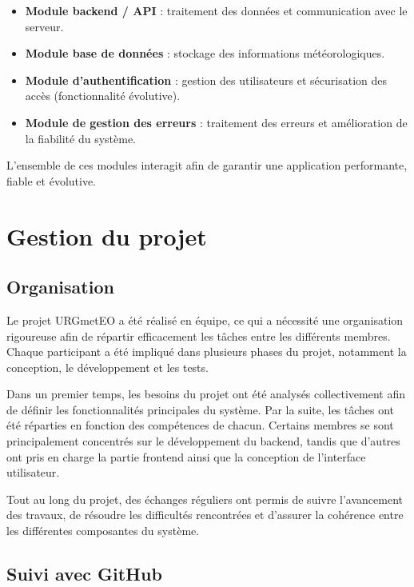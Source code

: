 \begin{itemize}

\item \textbf{Module backend / API} : traitement des données et communication avec le serveur.

\item \textbf{Module base de données} : stockage des informations météorologiques.

\item \textbf{Module d’authentification} : gestion des utilisateurs et sécurisation des accès (fonctionnalité évolutive).

\item \textbf{Module de gestion des erreurs} : traitement des erreurs et amélioration de la fiabilité du système.

\end{itemize}

\noindent L’ensemble de ces modules interagit afin de garantir une application performante, fiable et évolutive.


\section{Gestion du projet}

\subsection{Organisation}

Le projet URGmetEO a été réalisé en équipe, ce qui a nécessité une organisation rigoureuse afin de répartir efficacement les tâches entre les différents membres. Chaque participant a été impliqué dans plusieurs phases du projet, notamment la conception, le développement et les tests.

\noindent Dans un premier temps, les besoins du projet ont été analysés collectivement afin de définir les fonctionnalités principales du système. Par la suite, les tâches ont été réparties en fonction des compétences de chacun. Certains membres se sont principalement concentrés sur le développement du backend, tandis que d’autres ont pris en charge la partie frontend ainsi que la conception de l’interface utilisateur.

\noindent Tout au long du projet, des échanges réguliers ont permis de suivre l’avancement des travaux, de résoudre les difficultés rencontrées et d’assurer la cohérence entre les différentes composantes du système.

\subsection{Suivi avec GitHub}

